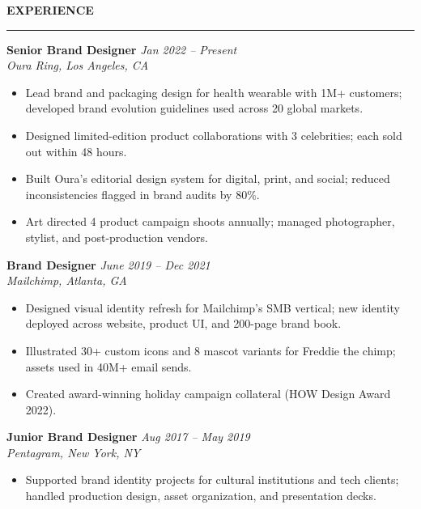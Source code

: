 \documentclass[11pt,a4paper]{article}
\begin{document}
\begin{minipage}[t]{0.61\textwidth}
\small

\noindent\textcolor{accent}{\textbf{EXPERIENCE}}\\
\rule{\linewidth}{0.4pt}

\vspace{2pt}
\noindent\textbf{Senior Brand Designer} \hfill \textit{Jan 2022 -- Present}\\
\textit{Oura Ring, Los Angeles, CA}
\begin{itemize}
  \item Lead brand and packaging design for health wearable with 1M+ customers; developed brand evolution guidelines used across 20 global markets.
  \item Designed limited-edition product collaborations with 3 celebrities; each sold out within 48 hours.
  \item Built Oura's editorial design system for digital, print, and social; reduced inconsistencies flagged in brand audits by 80\%.
  \item Art directed 4 product campaign shoots annually; managed photographer, stylist, and post-production vendors.
\end{itemize}

\vspace{4pt}
\noindent\textbf{Brand Designer} \hfill \textit{June 2019 -- Dec 2021}\\
\textit{Mailchimp, Atlanta, GA}
\begin{itemize}
  \item Designed visual identity refresh for Mailchimp's SMB vertical; new identity deployed across website, product UI, and 200-page brand book.
  \item Illustrated 30+ custom icons and 8 mascot variants for Freddie the chimp; assets used in 40M+ email sends.
  \item Created award-winning holiday campaign collateral (HOW Design Award 2022).
\end{itemize}

\vspace{4pt}
\noindent\textbf{Junior Brand Designer} \hfill \textit{Aug 2017 -- May 2019}\\
\textit{Pentagram, New York, NY}
\begin{itemize}
  \item Supported brand identity projects for cultural institutions and tech clients; handled production design, asset organization, and presentation decks.
\end{itemize}


\end{minipage}
\end{document}
